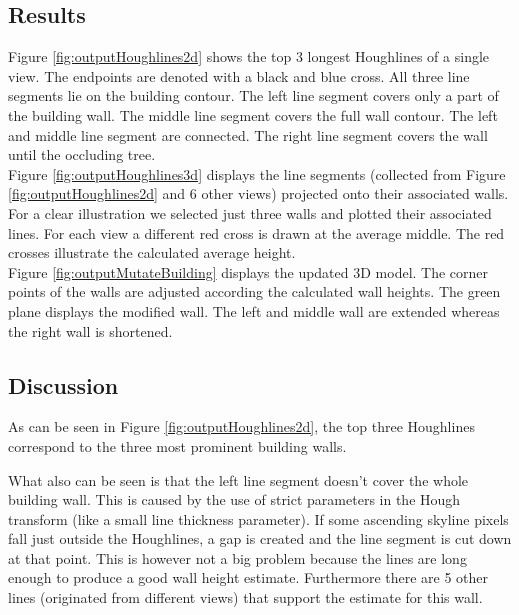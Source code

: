 \newpage
\subsection{Results}
\label{sec:ResultImprove}
\clearpage
{}

Figure \ref{fig:outputHoughlines2d} shows the top 3 longest Houghlines of a
single view. The endpoints are denoted with a black and blue cross. All three line segments lie on the
building contour.  The left line segment covers only a part of the building wall. The
middle line segment covers the full wall contour. The left and middle line segment are connected. The
right line segment covers the wall until the occluding tree.\\

Figure \ref{fig:outputHoughlines3d} displays the line segments (collected from
Figure \ref{fig:outputHoughlines2d} and 6 other views) projected onto their associated walls.
For a clear illustration we selected just three walls and plotted their associated
lines.  For each view a different red cross is drawn at the average middle. The
red crosses illustrate the calculated average height.\\
 
Figure \ref{fig:outputMutateBuilding} displays the updated 3D model. The corner
points of the walls are adjusted according the calculated wall heights.  The
green plane displays the modified wall. The left and middle wall are extended
whereas the right wall is shortened.\\


\subsection{Discussion}
As can be seen in Figure \ref{fig:outputHoughlines2d}, 
the top three Houghlines correspond to the three most prominent building walls.

What also can be seen is that the left line segment doesn't cover the whole
building wall. This is caused by the use of strict parameters in the Hough transform
(like a small line thickness parameter).  If some ascending skyline pixels fall just outside
the Houghlines, a gap is created and the line segment is cut down at that point.
This is however not a big problem because the lines are long enough to produce a
good wall height estimate. Furthermore there are 5 other lines
(originated from different views) that support the estimate for this wall.

